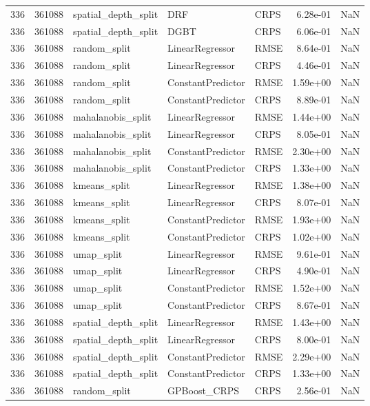 \begin{tabular}{rrlllrr}
336 & 361088 & spatial\_depth\_split & DRF & CRPS & 6.28e-01 & NaN \\
336 & 361088 & spatial\_depth\_split & DGBT & CRPS & 6.06e-01 & NaN \\
336 & 361088 & random\_split & LinearRegressor & RMSE & 8.64e-01 & NaN \\
336 & 361088 & random\_split & LinearRegressor & CRPS & 4.46e-01 & NaN \\
336 & 361088 & random\_split & ConstantPredictor & RMSE & 1.59e+00 & NaN \\
336 & 361088 & random\_split & ConstantPredictor & CRPS & 8.89e-01 & NaN \\
336 & 361088 & mahalanobis\_split & LinearRegressor & RMSE & 1.44e+00 & NaN \\
336 & 361088 & mahalanobis\_split & LinearRegressor & CRPS & 8.05e-01 & NaN \\
336 & 361088 & mahalanobis\_split & ConstantPredictor & RMSE & 2.30e+00 & NaN \\
336 & 361088 & mahalanobis\_split & ConstantPredictor & CRPS & 1.33e+00 & NaN \\
336 & 361088 & kmeans\_split & LinearRegressor & RMSE & 1.38e+00 & NaN \\
336 & 361088 & kmeans\_split & LinearRegressor & CRPS & 8.07e-01 & NaN \\
336 & 361088 & kmeans\_split & ConstantPredictor & RMSE & 1.93e+00 & NaN \\
336 & 361088 & kmeans\_split & ConstantPredictor & CRPS & 1.02e+00 & NaN \\
336 & 361088 & umap\_split & LinearRegressor & RMSE & 9.61e-01 & NaN \\
336 & 361088 & umap\_split & LinearRegressor & CRPS & 4.90e-01 & NaN \\
336 & 361088 & umap\_split & ConstantPredictor & RMSE & 1.52e+00 & NaN \\
336 & 361088 & umap\_split & ConstantPredictor & CRPS & 8.67e-01 & NaN \\
336 & 361088 & spatial\_depth\_split & LinearRegressor & RMSE & 1.43e+00 & NaN \\
336 & 361088 & spatial\_depth\_split & LinearRegressor & CRPS & 8.00e-01 & NaN \\
336 & 361088 & spatial\_depth\_split & ConstantPredictor & RMSE & 2.29e+00 & NaN \\
336 & 361088 & spatial\_depth\_split & ConstantPredictor & CRPS & 1.33e+00 & NaN \\
336 & 361088 & random\_split & GPBoost\_CRPS & CRPS & 2.56e-01 & NaN \\

\end{tabular}
